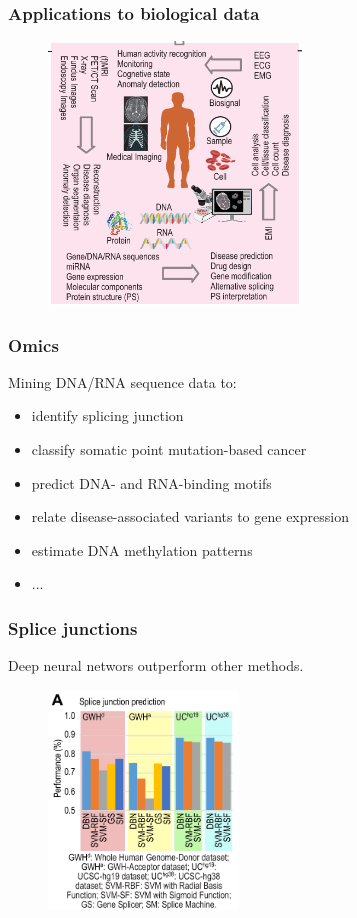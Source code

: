 \begin{frame}
        \frametitle{Applications to biological data}

	\begin{figure}
                \includegraphics[width=0.6\textwidth]{Pics/biology.png}
        \end{figure}

\end{frame}

\begin{frame}
	\frametitle{Omics}

	Mining DNA/RNA sequence data to:
	\begin{itemize}
		\item identify splicing junction
		\item classify somatic point mutation-based cancer
		\item predict DNA- and RNA-binding motifs
		\item relate disease-associated variants to gene expression
		\item estimate DNA methylation patterns
		\item ...
	\end{itemize}

\end{frame}

\begin{frame}
	\frametitle{Splice junctions}

	Deep neural networs outperform other methods.

	\begin{figure}
                \includegraphics[width=0.45\textwidth]{Pics/splice.png}
        \end{figure}

\end{frame}

